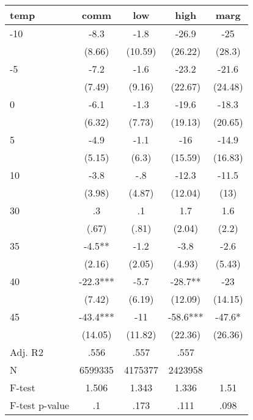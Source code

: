\documentclass[]{article}
\begin{document}
\begin{tabular}{lcccc} \hline
temp & comm & low & high & marg \\ \hline
-10 & -8.3 & -1.8 & -26.9 & -25 \\
 & (8.66) & (10.59) & (26.22) & (28.3) \\
-5 & -7.2 & -1.6 & -23.2 & -21.6 \\
 & (7.49) & (9.16) & (22.67) & (24.48) \\
0 & -6.1 & -1.3 & -19.6 & -18.3 \\
 & (6.32) & (7.73) & (19.13) & (20.65) \\
5 & -4.9 & -1.1 & -16 & -14.9 \\
 & (5.15) & (6.3) & (15.59) & (16.83) \\
10 & -3.8 & -.8 & -12.3 & -11.5 \\
 & (3.98) & (4.87) & (12.04) & (13) \\
30 & .3 & .1 & 1.7 & 1.6 \\
 & (.67) & (.81) & (2.04) & (2.2) \\
35 & -4.5** & -1.2 & -3.8 & -2.6 \\
 & (2.16) & (2.05) & (4.93) & (5.43) \\
40 & -22.3*** & -5.7 & -28.7** & -23 \\
 & (7.42) & (6.19) & (12.09) & (14.15) \\
45 & -43.4*** & -11 & -58.6*** & -47.6* \\
 & (14.05) & (11.82) & (22.36) & (26.36) \\
\hline Adj. R2 & .556 & .557 & .557 &  \\
N & 6599335 & 4175377 & 2423958 &  \\
F-test & 1.506 & 1.343 & 1.336 & 1.51 \\
 F-test p-value & .1 & .173 & .111 & .098 \\ \hline
\end{tabular}
\end{document}
